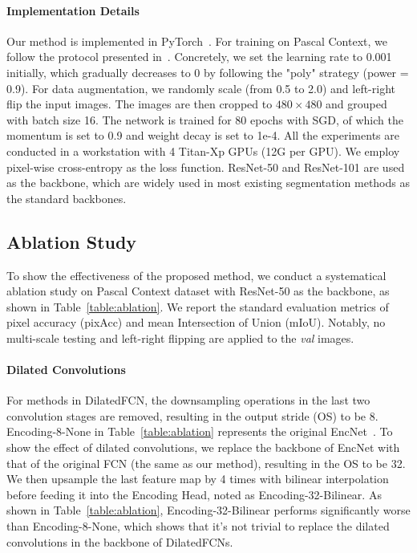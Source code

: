 \documentclass[10pt,twocolumn,letterpaper]{article}
\begin{document}
\paragraph{Implementation Details}
Our method is implemented in PyTorch~\cite{paszke2017automatic}.
For training on Pascal Context, we follow the protocol presented in~\cite{zhang2018context}.
Concretely, we set the learning rate to 0.001 initially, which gradually decreases to 0 by following the "poly" strategy (power = 0.9).
For data augmentation, we randomly scale (from 0.5 to 2.0) and left-right flip the input images.
The images are then cropped to $480\times 480$ and grouped with batch size 16.
The network is trained for 80 epochs with SGD, of which the momentum is set to 0.9 and weight decay is set to 1e-4.
All the experiments are conducted in a workstation with 4 Titan-Xp GPUs (12G per GPU).
We employ pixel-wise cross-entropy as the loss function.
ResNet-50 and ResNet-101 are used as the backbone, which are widely used in most existing segmentation methods as the standard backbones.
\subsection{Ablation Study}
To show the effectiveness of the proposed method, we conduct a systematical ablation study on Pascal Context dataset with ResNet-50 as the backbone, as shown in Table~\ref{table:ablation}.
We report the standard evaluation metrics of pixel accuracy (pixAcc) and mean Intersection of Union (mIoU).
Notably, no multi-scale testing and left-right flipping are applied to the \textit{val} images.
\vspace{-1em}
\paragraph{Dilated Convolutions}
For methods in DilatedFCN, the downsampling operations in the last two convolution stages are removed, resulting in the output stride (OS) to be 8.
Encoding-8-None in Table~\ref{table:ablation} represents the original EncNet~\cite{zhang2018context}.
To show the effect of dilated convolutions, we replace the backbone of EncNet with that of the original FCN (the same as our method), resulting in the OS to be 32.
We then upsample the last feature map by 4 times with bilinear interpolation before feeding it into the Encoding Head, noted as Encoding-32-Bilinear.
As shown in Table~\ref{table:ablation}, Encoding-32-Bilinear performs significantly worse than Encoding-8-None, which shows that it's not trivial to replace the dilated convolutions in the backbone of DilatedFCNs.
\vspace{-1em}
\end{document}
